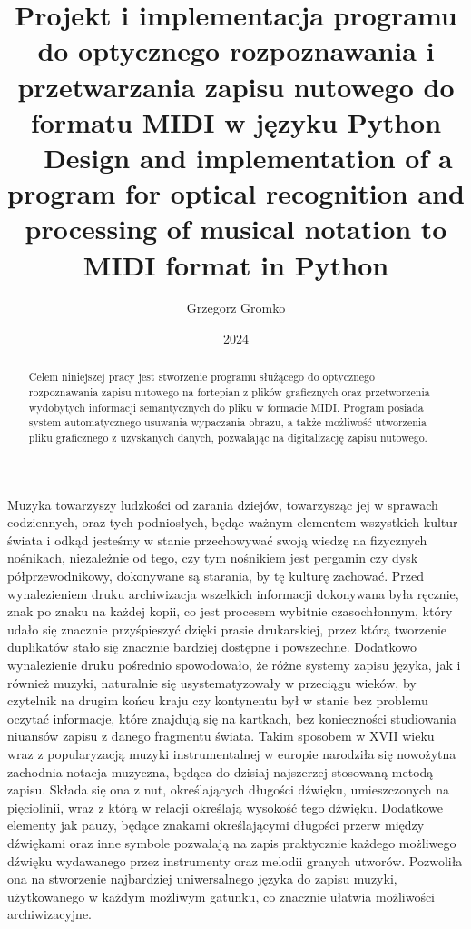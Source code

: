 \documentclass[xodstep]{wnspt}
\author      {Grzegorz Gromko}
\date        {2024}
\title{ Projekt i implementacja programu do optycznego rozpoznawania i przetwarzania zapisu nutowego do formatu MIDI w języku Python
\\{~}
Design and implementation of a program for optical recognition and processing of musical notation to MIDI format in Python}
\begin{document}
\maketitle
\onehalfspacing

\begin{abstract}
	Celem niniejszej pracy jest stworzenie programu służącego do optycznego rozpoznawania zapisu nutowego na fortepian z plików graficznych oraz przetworzenia wydobytych informacji semantycznych do pliku w formacie MIDI. Program posiada system automatycznego usuwania wypaczania obrazu, a także możliwość utworzenia pliku graficznego z uzyskanych danych, pozwalając na digitalizację zapisu nutowego.
\end{abstract}



\introduction


Muzyka towarzyszy ludzkości od zarania dziejów, towarzysząc jej w sprawach codziennych, oraz tych podniosłych, będąc ważnym elementem wszystkich kultur świata i odkąd jesteśmy w stanie przechowywać swoją wiedzę na fizycznych nośnikach, niezależnie od tego, czy tym nośnikiem jest pergamin czy dysk półprzewodnikowy, dokonywane są starania, by tę kulturę zachować. Przed wynalezieniem druku archiwizacja wszelkich informacji dokonywana była ręcznie, znak po znaku na każdej kopii, co jest procesem wybitnie czasochłonnym, który udało się znacznie przyśpieszyć dzięki prasie drukarskiej, przez którą tworzenie duplikatów stało się znacznie bardziej dostępne i powszechne. Dodatkowo wynalezienie druku pośrednio spowodowało, że różne systemy zapisu języka, jak i również muzyki, naturalnie się usystematyzowały w przeciągu wieków, by czytelnik na drugim końcu kraju czy kontynentu był w stanie bez problemu oczytać informacje, które znajdują się na kartkach, bez konieczności studiowania niuansów zapisu z danego fragmentu świata. Takim sposobem w XVII wieku wraz z popularyzacją muzyki instrumentalnej w europie narodziła się nowożytna zachodnia notacja muzyczna, będąca do dzisiaj najszerzej stosowaną metodą zapisu. Składa się ona z nut, określających długości dźwięku, umieszczonych na pięciolinii, wraz z którą w relacji określają wysokość tego dźwięku. Dodatkowe elementy jak pauzy, będące znakami określającymi długości przerw między dźwiękami oraz inne symbole pozwalają na zapis praktycznie każdego możliwego dźwięku wydawanego przez instrumenty oraz melodii granych utworów. Pozwoliła ona na stworzenie najbardziej uniwersalnego języka do zapisu muzyki, użytkowanego w każdym możliwym gatunku, co znacznie ułatwia możliwości archiwizacyjne.
\end{document}
